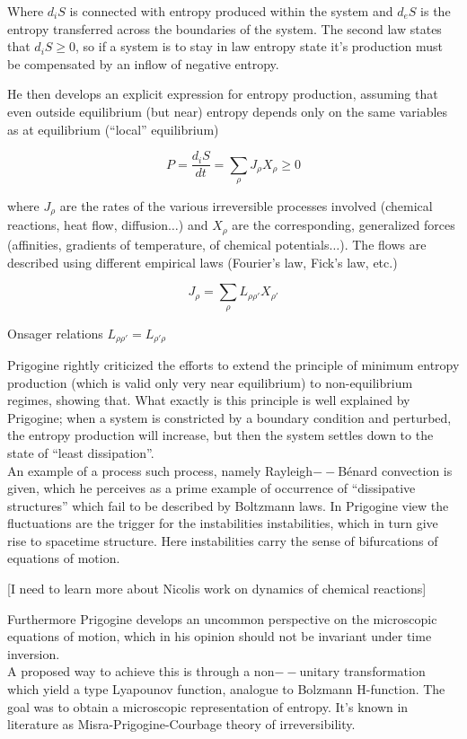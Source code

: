 \documentclass[a4paper,12pt,nofootinbib]{article}
\begin{document}
Where \(d_iS\) is connected with entropy produced within the system and \(d_eS\) is the entropy transferred across the boundaries of the system.
The second law states that \(d_iS\geq 0\), so if a system is to stay in law entropy state it{'}s production must be compensated by an inflow of negative
entropy.

He then develops an explicit expression for entropy production, assuming that even outside equilibrium (but near) entropy depends only on the same
variables as at equilibrium ({``}local{''} equilibrium)

\begin{displaymath}
	P=\frac{d_iS}{dt}=\sum _{\rho } J_{\rho }X_{\rho }\geq 0
\end{displaymath}


where \(J_{\rho }\) are the rates of the various irreversible processes involved (chemical reactions, heat flow, diffusion$\ldots $) and \(X_{\rho
}\) are the corresponding, generalized forces (affinities, gradients of temperature, of chemical potentials$\ldots $). The flows are described using
different empirical laws (Fourier{'}s law, Fick{'}s law, etc.) 

\begin{displaymath}
	J_{\rho }=\sum _{\rho } L_{\rho \rho '}X_{\rho '}
\end{displaymath}


Onsager relations \(L_{\rho \rho '}=L_{\rho '\rho }\)

Prigogine rightly criticized the efforts to extend the principle of minimum entropy production (which is valid only very near equilibrium)
to non-equilibrium regimes, showing that. What exactly is this principle is well explained by Prigogine; when a system is constricted by a boundary
condition and perturbed, the entropy production will increase, but then the system settles down to the state of {``}least dissipation{''}.\\
An example of a process such process, namely Rayleigh$--$B{\' e}nard convection is given, which he perceives as a prime example of occurrence of
{``}dissipative structures{''} which fail to be described by Boltzmann laws. In Prigogine view the fluctuations are the trigger for the instabilities
instabilities, which in turn give rise to spacetime structure. Here instabilities carry the sense of bifurcations of equations of motion.

[I need to learn more about Nicolis work on dynamics of chemical reactions]

Furthermore Prigogine develops an uncommon perspective on the microscopic equations of motion, which in his opinion should not be invariant under
time inversion.\\
A proposed way to achieve this is through a non$--$unitary transformation which yield a type Lyapounov function, analogue to Bolzmann H-function.
The goal was to obtain a microscopic representation of entropy. It{'}s known in literature as Misra-Prigogine-Courbage theory of irreversibility.
\end{document}
